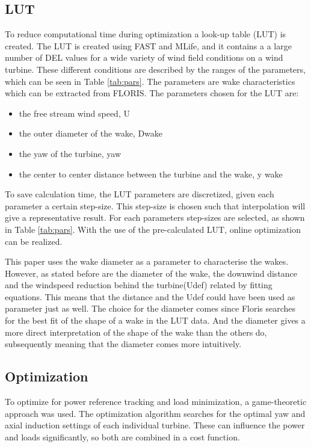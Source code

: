 \subsection{LUT} \label{sec:lut}
 To reduce computational time during optimization a look-up table (LUT) is created. The LUT is created using FAST and MLife, and it contains a a large number of DEL values for a wide variety of wind field conditions on a wind turbine.
These different conditions are described by the ranges of the parameters, which can be seen in Table \ref{tab:pars}. The parameters are wake characteristics which can be extracted from FLORIS. The parameters chosen for the LUT are:\begin{itemize}
	\item the free stream wind speed, U
	\item the outer diameter of the wake, Dwake
	\item the yaw of the turbine, yaw  
	\item the center to center distance between the turbine and the wake, y wake 
\end{itemize}   
 To save calculation time, the LUT parameters are discretized, given each parameter a certain step-size. This step-size is chosen such that interpolation will give a representative result. For each parameters step-sizes are selected, as shown in Table \ref{tab:pars}. With the use of the pre-calculated LUT, online optimization can be realized.



 This paper uses the wake diameter as a parameter to characterise the wakes. However, as stated before are the diameter of the wake, the downwind distance and the windspeed reduction behind the turbine(Udef) related by fitting equations. This means that the distance and the Udef could have been used as parameter just as well. The choice for the diameter comes since Floris searches for the best fit of the shape of a wake in the LUT data. And the diameter gives a more direct interpretation of the shape of the wake than the others do, subsequently meaning that the diameter comes more intuitively.

 
 

\subsection{Optimization} \label{sec:optimization}
To optimize for power reference tracking and load minimization, a game-theoretic approach was used.\cite{Marden2013} The optimization algorithm searches for the optimal yaw and axial induction settings of each individual turbine. These can influence the power and loads significantly, so both are combined in a cost function. \cite{Marden2013}\cite{Dijk2016} 

